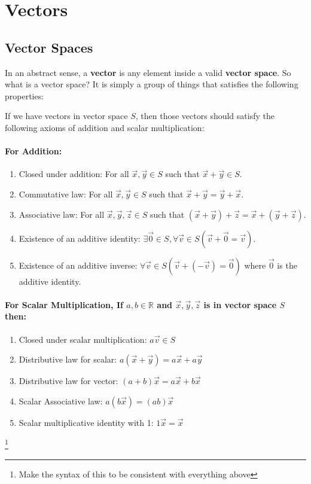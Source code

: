 \section{Vectors}

\subsection{Vector Spaces}

In an abstract sense, a \textbf{vector} is any element inside a valid \textbf{vector space}. So what is a vector space? It is simply a group of things that satisfies the following properties:

If we have vectors in vector space $S$, then those vectors should
satisfy the following axioms of addition and scalar multiplication:

\sgap
\paragraph{For Addition:}
\begin{enumerate}
    \item Closed under addition: For all $\vec{x}, \vec{y} \in S$ such that $\vec{x} + \vec{y} \in S$.
    \item Commutative law: For all $\vec{x}, \vec{y} \in S$ such that $\vec{x} + \vec{y} = \vec{y} + \vec{x}$.
    \item Associative law: For all $\vec{x}, \vec{y}, \vec{z} \in S$ such that $(\vec{x} + \vec{y}) + \vec{z} = \vec{x} + (\vec{y} + \vec{z})$.

    \item Existence of an additive identity: $\exists \vec{0} \in S, \forall \vec{v} \in S (\vec{v} + \vec{0} = \vec{v})$.
    \item Existence of an additive inverse: $\forall \vec{v} \in S (\vec{v} + (-\vec{v}) = \vec{0})$ where $\vec{0}$ is the additive identity.
\end{enumerate}

\sgap
\paragraph{For Scalar Multiplication, If $a,b \in \mathbb{R}$ and $\vec{x}, \vec{y}, \vec{z}$ is in vector space $S$ then:}
\begin{enumerate}
    \item Closed under scalar multiplication: $a\vec{v} \in S$
    \item Distributive law for scalar: $a(\vec{x} + \vec{y}) = a\vec{x} + a\vec{y}$
    \item Distributive law for vector: $(a + b)\vec{x} = a\vec{x} + b\vec{x}$

    \item Scalar Associative law: $a(b\vec{x}) = (ab)\vec{x}$
    \item Scalar multiplicative identity with 1: $1\vec{x} = \vec{x}$
\end{enumerate}\footnote{Make the syntax of this to be consistent with everything above}

